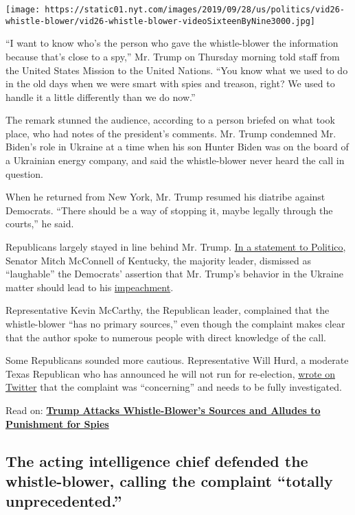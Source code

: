 \texttt{[image: https://static01.nyt.com/images/2019/09/28/us/politics/vid26-whistle-blower/vid26-whistle-blower-videoSixteenByNine3000.jpg]}

``I want to know who's the person who gave the whistle-blower the
information because that's close to a spy,'' Mr. Trump on Thursday
morning told staff from the United States Mission to the United Nations.
``You know what we used to do in the old days when we were smart with
spies and treason, right? We used to handle it a little differently than
we do now.''

The remark stunned the audience, according to a person briefed on what
took place, who had notes of the president's comments. Mr. Trump
condemned Mr. Biden's role in Ukraine at a time when his son Hunter
Biden was on the board of a Ukrainian energy company, and said the
whistle-blower never heard the call in question.

When he returned from New York, Mr. Trump resumed his diatribe against
Democrats. ``There should be a way of stopping it, maybe legally through
the courts,'' he said.

Republicans largely stayed in line behind Mr. Trump.
\href{https://www.politico.com/news/2019/09/25/mcconnell-ukraine-trump-001034}{In
a statement to Politico}, Senator Mitch McConnell of Kentucky, the
majority leader, dismissed as ``laughable'' the Democrats' assertion
that Mr. Trump's behavior in the Ukraine matter should lead to his
\href{https://www.nytimes.com/interactive/2019/11/20/us/politics/trump-impeachment-hearings.html}{impeachment}.

Representative Kevin McCarthy, the Republican leader, complained that
the whistle-blower ``has no primary sources,'' even though the complaint
makes clear that the author spoke to numerous people with direct
knowledge of the call.

Some Republicans sounded more cautious. Representative Will Hurd, a
moderate Texas Republican who has announced he will not run for
re-election,
\href{https://twitter.com/HurdOnTheHill/status/1177210957589831680}{wrote
on Twitter} that the complaint was ``concerning'' and needs to be fully
investigated.

Read on:
\textbf{\href{https://www.nytimes.com/2019/09/26/us/politics/trump-whistle-blower-spy.html}{Trump
Attacks Whistle-Blower's Sources and Alludes to Punishment for Spies}}

\hypertarget{the-acting-intelligence-chief-defended-the-whistle-blower-calling-the-complaint-totally-unprecedented}{%
\subsection{The acting intelligence chief defended the whistle-blower,
calling the complaint ``totally
unprecedented.''}\label{the-acting-intelligence-chief-defended-the-whistle-blower-calling-the-complaint-totally-unprecedented}}

